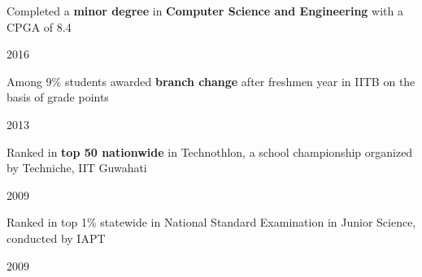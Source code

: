 \begin{cvbulletentries}
%
%
\datedbullet
{ %
\begin{cvonlybullets}
    \item {Completed a \textbf{minor degree} in \textbf{Computer Science and Engineering} with a CPGA of 8.4}
\end{cvonlybullets}
}
{ %
\begin{cvnobullets}
    \item{2016}
\end{cvnobullets}
}
\datedbullet
{ %
    \begin{cvonlybullets}
        \item {Among 9\% students awarded \textbf{branch change} after freshmen year in IITB on the basis of grade points}
    \end{cvonlybullets}
}
{ %
    \begin{cvnobullets}
        \item{2013}
    \end{cvnobullets}
}
\datedbullet
{ %
    \begin{cvonlybullets}
        \item {Ranked in \textbf{top 50 nationwide} in Technothlon, a school championship organized by Techniche, IIT Guwahati}
    \end{cvonlybullets}
}
{ %
    \begin{cvnobullets}
        \item{2009}
    \end{cvnobullets}
}
\datedbullet
{ %
    \begin{cvonlybullets}
        \item {Ranked in top 1\% statewide in National Standard Examination in Junior Science, conducted by IAPT}
    \end{cvonlybullets}
}
{ %
    \begin{cvnobullets}
        \item {2009}
    \end{cvnobullets}
}
%
\end{cvbulletentries}